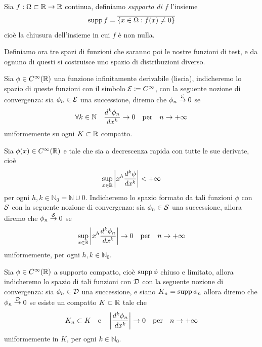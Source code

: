 \begin{definition}[ Supporto ]
  Sia $ f:\Omega \subset \mathbb{R} \to \mathbb{R} $ continua, definiamo \textit{supporto di $ f $} l'insieme
  \begin{align}
    \operatorname{\textnormal{supp}} f = \overline{\{x \in \Omega : f(x) \neq 0\}}
  \end{align}
  cioè la chiusura dell'insieme in cui $ f $ è non nulla. 
\end{definition}

Definiamo ora tre spazi di funzioni che saranno poi le nostre funzioni di test, e da ognuno di questi si costruisce uno spazio di distribuzioni diverso.

\begin{definition}[ Spazio $ \E $ ]
  Sia $ \phi \in C^\infty(\R) $ una funzione infinitamente derivabile (liscia), indicheremo lo spazio di queste funzioni con il simbolo 
  $ \mathcal{E} \coloneq C^\infty $, con la seguente nozione di convergenza: sia $ \phi_n \in \E $ una successione, 
  diremo che $ \phi_n \ov{\to}{\E} 0 $ se 
  \begin{align}
    \forall k \in \mathbb{N}\quad \frac{d^k \phi_n }{dx^k} \to 0 \quad \textnormal{per} \quad n\to +\infty
  \end{align}
  uniformemente su ogni $ K \subset \mathbb{R} $ compatto.
\end{definition}

\begin{definition}[ Spazio $ \S $ ]
  Sia $ \phi(x) \in C^\infty(\R) $ e tale che sia a decrescenza rapida con tutte le sue derivate, cioè 
  \begin{align}
    \sup_{x \in \R} \abs{x^h \frac{d^k \phi}{dx^k}} < +\infty
  \end{align}
  per ogni $ h,k \in \mathbb{N}_0 = \mathbb{N} \cup 0 $. Indicheremo lo spazio formato da tali funzioni $ \phi $ con $ \S $ con la seguente 
  nozione di convergenza: sia $ \phi_n \in \S $ una successione, allora diremo che $ \phi_n \ov{\to}{\S} 0 $ se 
  \begin{align}
    \sup_{x \in \R} \abs{x^h \frac{d^k \phi_n}{dx^k}} \to 0 \quad \textnormal{per} \quad n\to +\infty
  \end{align}
  uniformemente, per ogni $ h,k \in \mathbb{N}_0 $.
\end{definition}

\begin{definition}[ Spazio $ \D $ ]
  Sia $ \phi \in C^\infty(\R) $ a supporto compatto, cioè $ \supp \phi $ chiuso e limitato, allora indicheremo lo spazio di tali funzioni con 
  $ \D $ con la seguente nozione di convergenza: sia $ \phi_n \in \D $ una successione, e siano $ K_n = \supp \phi_n $ 
  allora diremo che $ \phi_n \ov{\to}{\D} 0 $ se esiste un compatto $ K \subset \mathbb{R} $ tale che 
  \begin{align}
    K_n \subset K \quad \textnormal{e} \quad \abs{\frac{d^k \phi_n }{dx^k}} \to 0 \quad \textnormal{per} \quad n\to +\infty
  \end{align}
  uniformemente in $ K $, per ogni $ k \in \mathbb{N}_0 $.
\end{definition}

